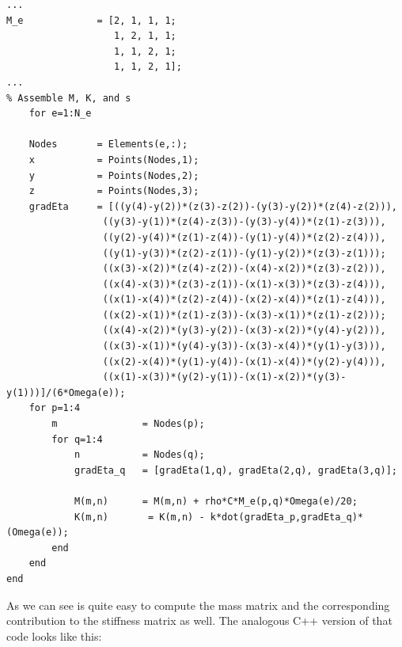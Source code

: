 \documentclass[12pt]{article}
\begin{document}
\begin{lstlisting}
...
M_e             = [2, 1, 1, 1; 
                   1, 2, 1, 1;
                   1, 1, 2, 1;
                   1, 1, 2, 1];
...
% Assemble M, K, and s
    for e=1:N_e
	
	Nodes       = Elements(e,:);
	x           = Points(Nodes,1);
	y           = Points(Nodes,2);
	z           = Points(Nodes,3);
	gradEta  	= [((y(4)-y(2))*(z(3)-z(2))-(y(3)-y(2))*(z(4)-z(2))), 
				 ((y(3)-y(1))*(z(4)-z(3))-(y(3)-y(4))*(z(1)-z(3))), 
				 ((y(2)-y(4))*(z(1)-z(4))-(y(1)-y(4))*(z(2)-z(4))), 
				 ((y(1)-y(3))*(z(2)-z(1))-(y(1)-y(2))*(z(3)-z(1)));
				 ((x(3)-x(2))*(z(4)-z(2))-(x(4)-x(2))*(z(3)-z(2))), 
				 ((x(4)-x(3))*(z(3)-z(1))-(x(1)-x(3))*(z(3)-z(4))), 
				 ((x(1)-x(4))*(z(2)-z(4))-(x(2)-x(4))*(z(1)-z(4))), 
				 ((x(2)-x(1))*(z(1)-z(3))-(x(3)-x(1))*(z(1)-z(2)));
				 ((x(4)-x(2))*(y(3)-y(2))-(x(3)-x(2))*(y(4)-y(2))), 
				 ((x(3)-x(1))*(y(4)-y(3))-(x(3)-x(4))*(y(1)-y(3))), 
				 ((x(2)-x(4))*(y(1)-y(4))-(x(1)-x(4))*(y(2)-y(4))), 
				 ((x(1)-x(3))*(y(2)-y(1))-(x(1)-x(2))*(y(3)-y(1)))]/(6*Omega(e)); 
	for p=1:4
		m               = Nodes(p);
		for q=1:4 
			n           = Nodes(q);
			gradEta_q   = [gradEta(1,q), gradEta(2,q), gradEta(3,q)];
							
			M(m,n)      = M(m,n) + rho*C*M_e(p,q)*Omega(e)/20;
			K(m,n)       = K(m,n) - k*dot(gradEta_p,gradEta_q)*(Omega(e));
		end
	end
end
\end{lstlisting}

As we can see is quite easy to compute the mass matrix and the corresponding contribution to the stiffness matrix as well. The analogous C++ version of that code looks like this: 
\end{document}
